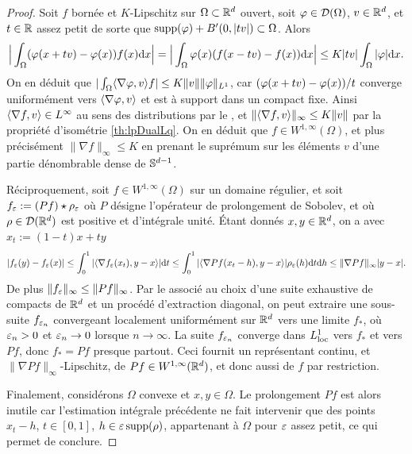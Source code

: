 \begin{proof}
	Soit $f$ bornée et $K$-Lipschitz sur $\Omega\subset \mathbb{R}^d$ ouvert, soit $\varphi \in \mathcal{D}(\Omega)$, $v \in \mathbb{R}^d$, et $t\in \mathbb{R}$ assez petit de sorte que $\operatorname{supp}(\varphi)+B'(0,|tv|) \subset \Omega$. Alors 
	\begin{equation*}
		\Big|\int_\Omega (\varphi(x+tv)-\varphi(x)) f(x)\mathrm{d} x \Big|
		= \Big|\int_\Omega \varphi(x) (f(x-tv) - f(x))\mathrm{d} x\Big|
		\leq K |tv| \int_\Omega |\varphi| \mathrm{d} x.
	\end{equation*}
	On en déduit que $|\int_\Omega \langle\nabla \varphi,v\rangle f| \leq K \|v\| \|\varphi\|_{L^1}$, car $(\varphi(x+tv)-\varphi(x))/t$ converge uniformément vers $\langle\nabla \varphi,v\rangle$ et est à support dans un compact fixe. Ainsi $\langle\nabla f,v\rangle \in L^\infty$ au sens des distributions par le , et $\|\langle\nabla f,v\rangle\|_\infty \leq K \|v\|$ par la propriété d'isométrie \cref{th:lpDualLq}. On en déduit que $f \in W^{1,\infty}(\Omega)$, et plus précisément $\|\nabla f\|_\infty \leq K$ en prenant le suprémum sur les éléments $v$ d'une partie dénombrable dense de $\mathbb{S}^{d-1}$.

	Réciproquement, soit $f\in W^{1,\infty}(\Omega)$ sur un domaine régulier, et soit $f_\varepsilon := (Pf) \star \rho_\varepsilon$ où $P$ désigne l'opérateur de prolongement de Sobolev, et où $\rho\in \mathcal{D}(\mathbb{R}^d)$ est positive et d'intégrale unité. 
	Étant donnés $x,y\in \mathbb{R}^d$, on a avec  $x_t := (1-t) x+t y$
	\begin{equation*}
		|f_\varepsilon(y)-f_\varepsilon(x)| \leq \int_0^1 |\langle\nabla f_\varepsilon (x_t) ,y-x\rangle| \mathrm{d} t \leq \int_0^1 |\langle\nabla Pf (x_t-h),y-x\rangle|\rho_\varepsilon (h) \mathrm{d} t \mathrm{d} h \leq \|\nabla P f\|_\infty |y-x|.
	\end{equation*}
	De plus $\|f_\varepsilon\|_\infty \leq \|P f\|_\infty$. Par le  associé au choix d'une suite exhaustive de compacts de $\mathbb{R}^d$ et un procédé d'extraction diagonal, on peut extraire une sous-suite $f_{\varepsilon_n}$ convergeant localement uniformément sur $\mathbb{R}^d$ vers une limite $f_*$, où $\varepsilon_n>0$ et $\varepsilon_n \to 0$ lorsque $n \to \infty$. 
	La suite $f_{\varepsilon_n}$ converge dans $L^1_{\mathrm{loc}}$ vers $f_*$ et vers $P f$, donc $f_* = P f$ presque partout. Ceci fournit un représentant continu, et $\|\nabla P f\|_\infty$-Lipschitz, de $P f \in W^{1,\infty}(\mathbb{R}^d)$, et donc aussi de $f$ par restriction.
	
	Finalement, considérons $\Omega$ convexe et $x,y \in \Omega$. Le prolongement $P f$ est alors inutile car l'estimation intégrale précédente ne fait intervenir que des points $x_t - h$, $t \in [0,1]$, $h \in \varepsilon \operatorname{supp}(\rho)$, appartenant à $\Omega$ pour $\varepsilon$ assez petit, ce qui permet de conclure.
\end{proof}



